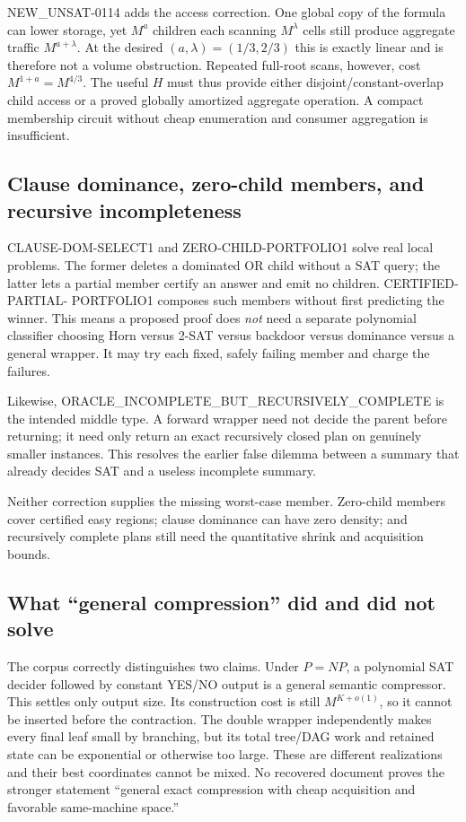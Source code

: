\documentclass[10pt]{article}
\begin{document}
NEW\_UNSAT-0114 adds the access correction.  One global copy of the formula
can lower storage, yet $M^a$ children each scanning $M^\lambda$ cells still
produce aggregate traffic $M^{a+\lambda}$.  At the desired
$(a,\lambda)=(1/3,2/3)$ this is exactly linear and is therefore not a volume
obstruction.  Repeated full-root scans, however, cost $M^{1+a}=M^{4/3}$.
The useful $H$ must thus provide either disjoint/constant-overlap child access
or a proved globally amortized aggregate operation.  A compact membership
circuit without cheap enumeration and consumer aggregation is insufficient.

\subsection{Clause dominance, zero-child members, and recursive incompleteness}

CLAUSE-DOM-SELECT1 and ZERO-CHILD-PORTFOLIO1 solve real local problems.  The
former deletes a dominated OR child without a SAT query; the latter lets a
partial member certify an answer and emit no children.  CERTIFIED-PARTIAL-
PORTFOLIO1 composes such members without first predicting the winner.  This
means a proposed proof does \emph{not} need a separate polynomial classifier
choosing Horn versus 2-SAT versus backdoor versus dominance versus a general
wrapper.  It may try each fixed, safely failing member and charge the failures.

Likewise, ORACLE\_INCOMPLETE\_BUT\_RECURSIVELY\_COMPLETE is the intended
middle type.  A forward wrapper need not decide the parent before returning;
it need only return an exact recursively closed plan on genuinely smaller
instances.  This resolves the earlier false dilemma between a summary that
already decides SAT and a useless incomplete summary.

Neither correction supplies the missing worst-case member.  Zero-child
members cover certified easy regions; clause dominance can have zero density;
and recursively complete plans still need the quantitative shrink and
acquisition bounds.

\subsection{What ``general compression'' did and did not solve}

The corpus correctly distinguishes two claims.  Under $P=NP$, a polynomial
SAT decider followed by constant YES/NO output is a general semantic
compressor.  This settles only output size.  Its construction cost is still
$M^{K+o(1)}$, so it cannot be inserted before the contraction.  The double
wrapper independently makes every final leaf small by branching, but its
total tree/DAG work and retained state can be exponential or otherwise too
large.  These are different realizations and their best coordinates cannot be
mixed.  No recovered document proves the stronger statement ``general exact
compression with cheap acquisition and favorable same-machine space.''
\end{document}
